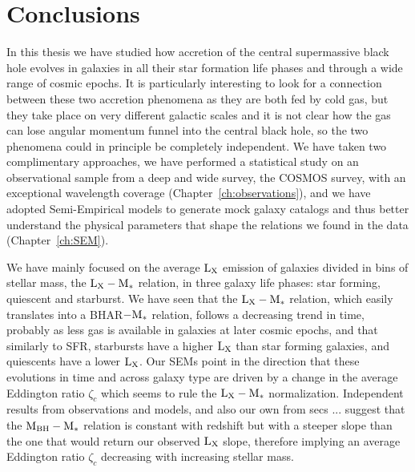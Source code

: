 \chapter{Conclusions}


In this thesis we have studied how accretion of the central supermassive black hole evolves in galaxies in all their star formation life phases and through a wide range of cosmic epochs. It is particularly interesting to look for a connection between these two accretion phenomena as they are both fed by cold gas, but they take place on very different galactic scales and it is not clear how the gas can lose angular momentum funnel into the central black hole, so the two phenomena could in principle be completely independent. We have taken two complimentary approaches, we have performed a statistical study on an observational sample from a deep and wide survey, the COSMOS survey, with an exceptional wavelength coverage (Chapter~\ref{ch:observations}), and we have adopted Semi-Empirical models to generate mock galaxy catalogs and thus better understand the physical parameters that shape the relations we found in the data (Chapter~\ref{ch:SEM}).

We have mainly focused on the average ${\rm L}_{\rm X}$ emission of galaxies divided in bins of stellar mass, the ${\rm L}_{\rm X}-{\rm M}_*$ relation, in three galaxy life phases: star forming, quiescent and starburst. We have seen that the ${\rm L}_{\rm X}-{\rm M}_*$ relation, which easily translates into a BHAR$-{\rm M}_*$ relation, follows a decreasing trend in time, probably as less gas is available in galaxies at later cosmic epochs, and that similarly to SFR, starbursts have a higher ${\rm L}_{\rm X}$ than star forming galaxies, and quiescents have a lower ${\rm L}_{\rm X}$. Our SEMs point in the direction that these evolutions in time and across galaxy type are driven by a change in the average Eddington ratio $\zeta_c$ which seems to rule the ${\rm L}_{\rm X}-{\rm M}_*$ normalization. Independent results from observations and models, and also our own from secs ... suggest that the ${\rm M}_{\rm BH}-{\rm M}_*$ relation is constant with redshift but with a steeper slope than the one that would return our observed ${\rm L}_{\rm X}$ slope, therefore implying an average Eddington ratio $\zeta_c$ decreasing with increasing stellar mass.

